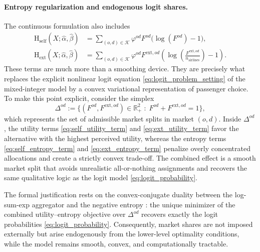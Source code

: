 \paragraph{Entropy regularization and endogenous logit shares.}
The continuous formulation also includes 
\begin{align}
\mathrm{H}_{\mathrm{self}}(X;\widehat{\alpha},\widehat{\beta})
&=
\sum_{(o,d)\in\mathcal{K}}
\varphi^{od}F^{od}\bigl(\log(F^{od})-1\bigr),
\label{eq:self_entropy_term}
\\
\mathrm{H}_{\mathrm{ext}}(X;\widehat{\alpha},\widehat{\beta})
&=
\sum_{(o,d)\in\mathcal{K}}
\varphi^{od}F^{\mathrm{ext},od}
\left(\log\left(\frac{F^{\mathrm{ext},od}}{n_{\mathrm{airlines}}}\right)-1\right).
\label{eq:ext_entropy_term}
\end{align}
These terms are much more than a smoothing device. They are precisely what replaces the explicit nonlinear logit equation \eqref{eq:logit_problem_setting} of the mixed-integer model by a convex variational representation of passenger choice. To make this point explicit, consider the simplex
\begin{equation}
\Delta^{od}:=\bigl\{(F^{od},F^{\mathrm{ext},od})\in\mathbb{R}_+^2 \;:\; F^{od}+F^{\mathrm{ext},od}=1\bigr\},
\label{eq:market_simplex}
\end{equation}
which represents the set of admissible market splits in market $(o,d)$. Inside $\Delta^{od}$, the utility terms \eqref{eq:self_utility_term} and \eqref{eq:ext_utility_term} favor the alternative with the highest perceived utility, whereas the entropy terms \eqref{eq:self_entropy_term} and \eqref{eq:ext_entropy_term} penalize overly concentrated allocations and create a strictly convex trade-off. The combined effect is a smooth market split that avoids unrealistic all-or-nothing assignments and recovers the same qualitative logic as the logit model \eqref{eq:logit_probability}.

The formal justification rests on the convex-conjugate duality between the log-sum-exp aggregator and the negative entropy \cite{Oppenheim1993,RealRojas2026TRB}: the unique minimizer of the combined utility--entropy objective over $\Delta^{od}$ recovers exactly the logit probabilities \eqref{eq:logit_probability}. Consequently, market shares are not imposed externally but arise endogenously from the lower-level optimality conditions, while the model remains smooth, convex, and computationally tractable.

